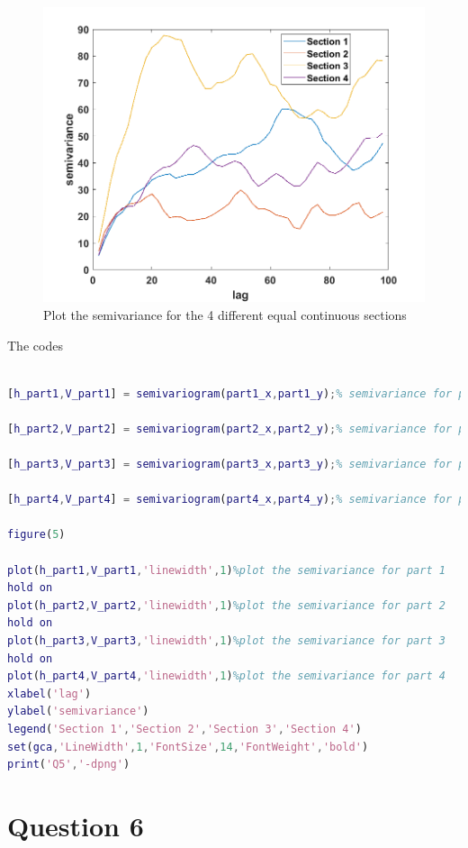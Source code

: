 \documentclass[
	12pt, %
]{fphw}
\begin{document}
\begin{figure}[htbp]
	\centering
	\includegraphics[width=0.8\columnwidth]{Q5.png} 
	\caption{Plot the semivariance for the 4 different equal continuous sections}
\end{figure}

The codes

\begin{lstlisting}[language=Matlab,escapeinside=``]

[h_part1,V_part1] = semivariogram(part1_x,part1_y);% semivariance for part 1

[h_part2,V_part2] = semivariogram(part2_x,part2_y);% semivariance for part 2

[h_part3,V_part3] = semivariogram(part3_x,part3_y);% semivariance for part 3

[h_part4,V_part4] = semivariogram(part4_x,part4_y);% semivariance for part 4

figure(5)

plot(h_part1,V_part1,'linewidth',1)%plot the semivariance for part 1
hold on
plot(h_part2,V_part2,'linewidth',1)%plot the semivariance for part 2
hold on
plot(h_part3,V_part3,'linewidth',1)%plot the semivariance for part 3
hold on
plot(h_part4,V_part4,'linewidth',1)%plot the semivariance for part 4
xlabel('lag')
ylabel('semivariance')
legend('Section 1','Section 2','Section 3','Section 4')
set(gca,'LineWidth',1,'FontSize',14,'FontWeight','bold')
print('Q5','-dpng')

\end{lstlisting}


\clearpage
\section*{Question 6 }
\end{document}
